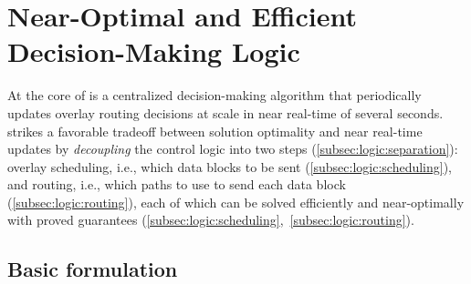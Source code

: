 \section{Near-Optimal and Efficient Decision-Making Logic}
\label{sec:logic}

At the core of \name is a centralized decision-making algorithm that
periodically updates overlay routing decisions at scale in near
real-time of several seconds. \name strikes a favorable tradeoff
between solution optimality and near real-time updates by
{\em decoupling} the control logic into two steps
(\Section\ref{subsec:logic:separation}):
overlay scheduling, i.e., which data blocks to be sent
(\Section\ref{subsec:logic:scheduling}),
and routing, i.e., which paths to use to send each data block
(\Section\ref{subsec:logic:routing}), each of which
can be solved efficiently and near-optimally with proved guarantees
(\Section\ref{subsec:logic:scheduling},~\ref{subsec:logic:routing}).

\subsection{Basic formulation}
\label{subsec:logic:formulation}


